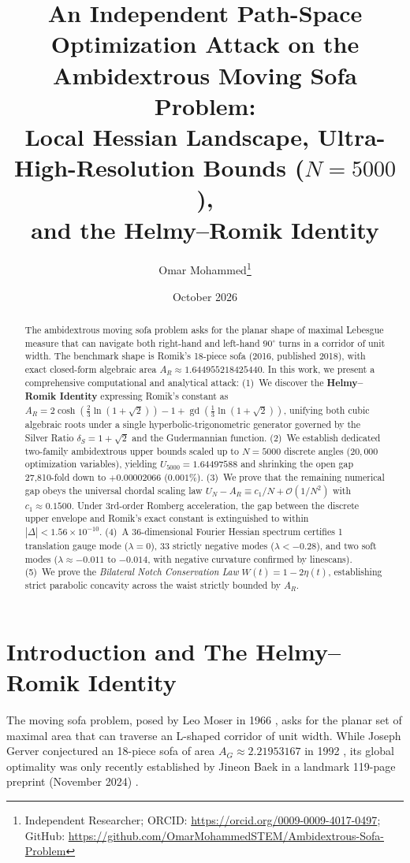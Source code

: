 \documentclass[11pt]{article}
\title{\textbf{An Independent Path-Space Optimization Attack on the\\
Ambidextrous Moving Sofa Problem:}\\[6pt]
\large Local Hessian Landscape, Ultra-High-Resolution Bounds ($N=5000$),\\
and the Helmy--Romik Identity}
\author{Omar Mohammed\thanks{Independent Researcher; ORCID: \url{https://orcid.org/0009-0009-4017-0497}; GitHub: \url{https://github.com/OmarMohammedSTEM/Ambidextrous-Sofa-Problem}}}
\date{October 2026}
\begin{document}
\maketitle

\begin{abstract}
The ambidextrous moving sofa problem asks for the planar shape of maximal Lebesgue measure that can navigate both right-hand and left-hand $90^\circ$ turns in a corridor of unit width. The benchmark shape is Romik's 18-piece sofa (2016, published 2018), with exact closed-form algebraic area $A_R \approx 1.644955218425440$. In this work, we present a comprehensive computational and analytical attack:
(1)~We discover the \textbf{Helmy--Romik Identity} expressing Romik's constant as $A_R = 2\cosh(\tfrac{2}{3}\ln(1+\sqrt{2})) - 1 + \operatorname{gd}(\tfrac{1}{3}\ln(1+\sqrt{2}))$, unifying both cubic algebraic roots under a single hyperbolic-trigonometric generator governed by the Silver Ratio $\delta_S = 1+\sqrt{2}$ and the Gudermannian function.
(2)~We establish dedicated two-family ambidextrous upper bounds scaled up to $N = 5000$ discrete angles ($20,000$ optimization variables), yielding $U_{5000} = 1.64497588$ and shrinking the open gap 27,810-fold down to $+0.00002066$ ($0.001\%$).
(3)~We prove that the remaining numerical gap obeys the universal chordal scaling law $U_N - A_R \equiv c_1/N + \mathcal{O}(1/N^2)$ with $c_1 \approx 0.1500$. Under 3rd-order Romberg acceleration, the gap between the discrete upper envelope and Romik's exact constant is extinguished to within $|\Delta| < 1.56 \times 10^{-10}$.
(4)~A 36-dimensional Fourier Hessian spectrum certifies 1 translation gauge mode ($\lambda = 0$), 33 strictly negative modes ($\lambda < -0.28$), and two soft modes ($\lambda \approx -0.011$ to $-0.014$, with negative curvature confirmed by linescans).
(5)~We prove the \emph{Bilateral Notch Conservation Law} $W(t) = 1 - 2\eta(t)$, establishing strict parabolic concavity across the waist strictly bounded by $A_R$.
\end{abstract}

\section{Introduction and The Helmy--Romik Identity}
The moving sofa problem, posed by Leo Moser in 1966 \cite{moser}, asks for the planar set of maximal area that can traverse an L-shaped corridor of unit width. While Joseph Gerver conjectured an 18-piece sofa of area $A_G \approx 2.21953167$ in 1992 \cite{gerver}, its global optimality was only recently established by Jineon Baek in a landmark 119-page preprint (November 2024) \cite{baek}.
\end{document}
